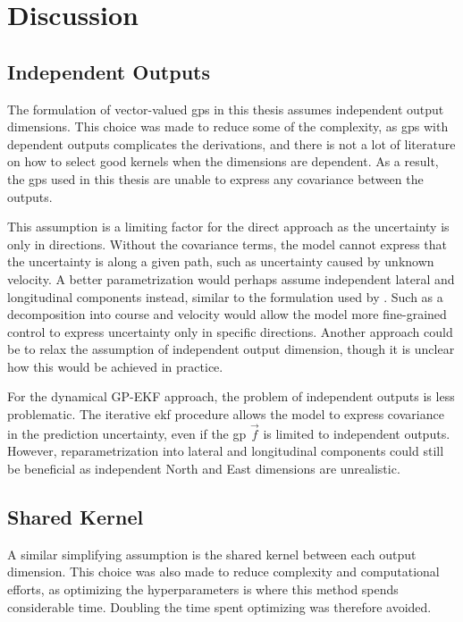 \chapter{Discussion}\label{chap:discussion}


\section{Independent Outputs}

The formulation of vector-valued \acrshort{gp}s in this thesis assumes independent output dimensions. This choice was made to reduce some of the complexity, as \acrshort{gp}s with dependent outputs complicates the derivations, and there is not a lot of literature on how to select good kernels when the dimensions are dependent. As a result, the \acrshort{gp}s used in this thesis are unable to express any covariance between the outputs. 

This assumption is a limiting factor for the direct approach as the uncertainty is only in directions. Without the covariance terms, the model cannot express that the uncertainty is along a given path, such as uncertainty caused by unknown velocity. A better parametrization would perhaps assume independent lateral and longitudinal components instead, similar to the formulation used by \cite{gp_ais_trajectory}. Such as a decomposition into course and velocity would allow the model more fine-grained control to express uncertainty only in specific directions. Another approach could be to relax the assumption of independent output dimension, though it is unclear how this would be achieved in practice. 

For the dynamical GP-EKF approach, the problem of independent outputs is less problematic. The iterative \acrshort{ekf} procedure allows the model to express covariance in the prediction uncertainty, even if the \acrshort{gp} $\vec{f}$ is limited to independent outputs. However, reparametrization into lateral and longitudinal components could still be beneficial as independent North and East dimensions are unrealistic.  

\section{Shared Kernel}
A similar simplifying assumption is the shared kernel between each output dimension. This choice was also made to reduce complexity and computational efforts, as optimizing the hyperparameters is where this method spends considerable time. Doubling the time spent optimizing was therefore avoided. 

